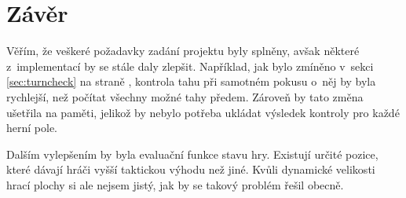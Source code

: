 \documentclass[10pt]{article}
\begin{document}






\newpage

\section{Závěr}

Věřím, že veškeré požadavky zadání projektu \cite{assign} byly splněny, avšak některé z~implementací by se stále daly zlepšit. Například, jak bylo zmíněno v~sekci \ref{sec:turncheck} na straně \pageref{sec:turncheck}, kontrola tahu při samotném pokusu o~něj by byla rychlejší, než počítat všechny možné tahy předem. Zároveň by tato změna ušetřila na paměti, jelikož by nebylo potřeba ukládat výsledek kontroly pro každé herní pole.

Dalším vylepšením by byla evaluační funkce stavu hry. Existují určité pozice, které dávají hráči vyšší taktickou výhodu než jiné. Kvůli dynamické velikosti hrací plochy si ale nejsem jistý, jak by se takový problém řešil obecně.

\renewcommand{\refname}{Zdroje}


\end{document}

